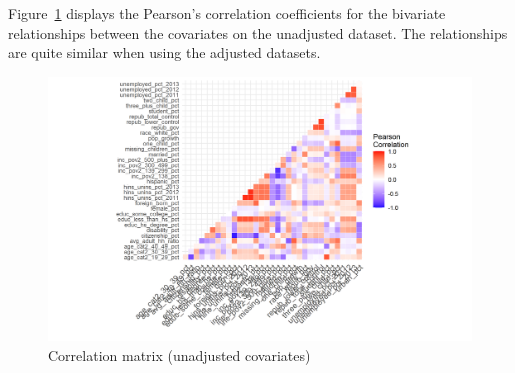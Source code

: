Figure~\ref{fig:corrmatrix} displays the Pearson's correlation coefficients for the bivariate relationships between the covariates on the unadjusted dataset. The relationships are quite similar when using the adjusted datasets.

\begin{figure}[]
\begin{center}
    \caption{Correlation matrix (unadjusted covariates)}
    \label{fig:corrmatrix}
    \includegraphics[scale=0.6]{01_Plots/correlation-plot-c1-sigma-zero.png}
\end{center}
\end{figure}
